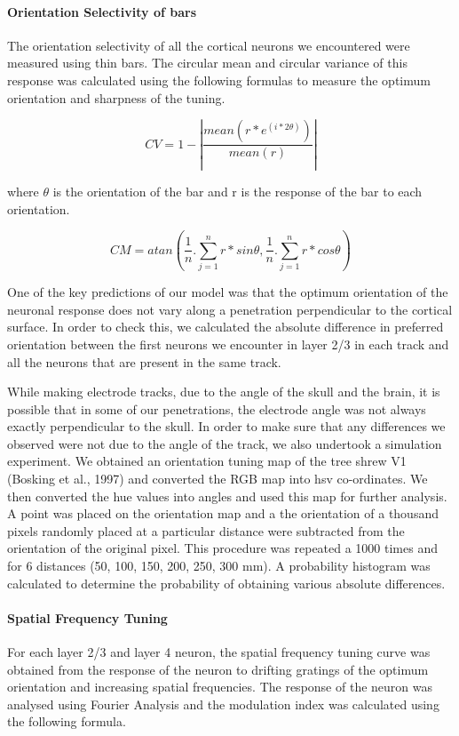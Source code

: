 \paragraph{Orientation Selectivity of bars}

The orientation selectivity of all the cortical neurons we encountered were measured using thin bars. The circular mean and circular variance of this response was calculated using the following formulas to measure the optimum orientation and sharpness of the tuning.

\[CV=1-|\frac{mean(r*e^{(i*2\theta)})}{mean(r)}|\]

where $\theta$ is the orientation of the bar and r is the response of the bar to each orientation.

\[CM=atan(\frac{1}{n}.\sum_{j=1}^{n}r*sin\theta, \frac{1}{n}.\sum_{j=1}^{n}r*cos\theta)\]


One of the key predictions of our model was that the optimum orientation of the neuronal response does not vary along a penetration perpendicular to the cortical surface. In order to check this, we calculated the absolute difference in preferred orientation between the first neurons we encounter in layer 2/3 in each track and all the neurons that are present in the same track.

While making electrode tracks, due to the angle of the skull and the brain, it is possible that in some of our penetrations, the electrode angle was not always exactly perpendicular to the skull. In order to make sure that any differences we observed were not due to the angle of the track, we also undertook a simulation experiment. We obtained an orientation tuning map of the tree shrew V1 (Bosking et al., 1997) and converted the RGB map into hsv co-ordinates. We then converted the hue values into angles and used this map for further analysis. A point was placed on the orientation map and a the orientation of a thousand pixels randomly placed at a particular distance were subtracted from the orientation of the original pixel. This procedure was repeated a 1000 times and for 6 distances (50, 100, 150, 200, 250, 300 mm). A probability histogram was calculated to determine the probability of obtaining various absolute differences.

\paragraph{Spatial Frequency Tuning}

For each layer 2/3 and layer 4 neuron, the spatial frequency tuning curve was obtained from the response of the neuron to drifting gratings of the optimum orientation and increasing spatial frequencies. The response of the neuron was analysed using Fourier Analysis and the modulation index was calculated using the following formula.

